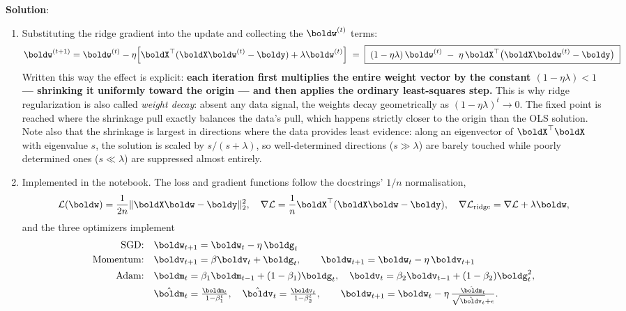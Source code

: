 \documentclass[submit]{../harvardml}
\newenvironment{solution}{
    \vspace{2mm}
    \color{blue}\noindent\textbf{Solution}:
}{}
\begin{document}
\begin{solution}
\begin{enumerate}
\item
Substituting the ridge gradient into the update and collecting the $\boldw^{(t)}$ terms:
\[
  \boldw^{(t+1)}
  = \boldw^{(t)} - \eta\Big[\boldX^\top(\boldX\boldw^{(t)}-\boldy) + \lambda\boldw^{(t)}\Big]
  \;=\;
  \boxed{\;(1-\eta\lambda)\,\boldw^{(t)} \;-\; \eta\,\boldX^\top\big(\boldX\boldw^{(t)}-\boldy\big)\;}
\]
Written this way the effect is explicit: \textbf{each iteration first multiplies the
entire weight vector by the constant $(1-\eta\lambda) < 1$ --- shrinking it uniformly
toward the origin --- and then applies the ordinary least-squares step.} This is why
ridge regularization is also called \emph{weight decay}: absent any data signal, the
weights decay geometrically as $(1-\eta\lambda)^t \to 0$. The fixed point is reached
where the shrinkage pull exactly balances the data's pull, which happens strictly
closer to the origin than the OLS solution. Note also that the shrinkage is largest in
directions where the data provides least evidence: along an eigenvector of
$\boldX^\top\boldX$ with eigenvalue $s$, the solution is scaled by $s/(s+\lambda)$, so
well-determined directions ($s \gg \lambda$) are barely touched while poorly
determined ones ($s \ll \lambda$) are suppressed almost entirely.

\item
Implemented in the notebook. The loss and gradient functions follow the docstrings'
$1/n$ normalisation,
\[
  \mathcal L(\boldw) = \frac{1}{2n}\|\boldX\boldw-\boldy\|_2^2, \quad
  \nabla \mathcal L = \frac1n \boldX^\top(\boldX\boldw-\boldy), \quad
  \nabla\mathcal L_{\text{ridge}} = \nabla\mathcal L + \lambda\boldw,
\]
and the three optimizers implement
\begin{align*}
  \text{SGD:}      &\quad \boldw_{t+1} = \boldw_t - \eta\,\boldg_t \\
  \text{Momentum:} &\quad \boldv_{t+1} = \beta\boldv_t + \boldg_t, \qquad \boldw_{t+1} = \boldw_t - \eta\,\boldv_{t+1} \\
  \text{Adam:}     &\quad \boldm_t = \beta_1\boldm_{t-1} + (1-\beta_1)\boldg_t, \quad
                          \boldv_t = \beta_2\boldv_{t-1} + (1-\beta_2)\boldg_t^2, \\
                   &\quad \hat\boldm_t = \tfrac{\boldm_t}{1-\beta_1^t}, \quad
                          \hat\boldv_t = \tfrac{\boldv_t}{1-\beta_2^t}, \qquad
                          \boldw_{t+1} = \boldw_t - \eta\,\tfrac{\hat\boldm_t}{\sqrt{\hat\boldv_t}+\epsilon}.
\end{align*}


\end{enumerate}
\end{solution}
\end{document}
